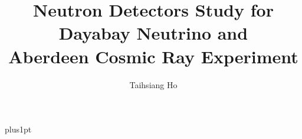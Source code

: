 \documentclass[12pt]{mythesis}
\title{Neutron Detectors Study for\\Dayabay Neutrino and\\Aberdeen Cosmic Ray Experiment}
\author{Taihsiang Ho}
\begin{document}
\baselineskip=18pt plus1pt

\setcounter{secnumdepth}{3}
\setcounter{tocdepth}{3}

\maketitle



\begin{romanpages}
\tableofcontents
\listoffigures
\end{romanpages}






%

%
%

%
%
\end{document}

